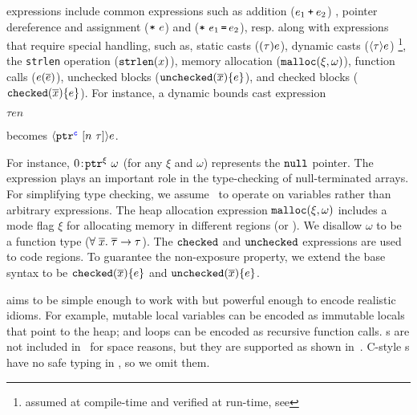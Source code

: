 \lang expressions include common expressions such as addition ($e_1 \mathbin{\texttt{+}} e_2$)
, pointer dereference and assignment ($\texttt{*}~{e}$) and ($\texttt{*}~{e_1}\,\texttt{=}\, {e_2}$), resp.
along with expressions that require special handling, such as,
 static casts ($\mathtt{(}{\tau}\mathtt{)}{e}$), dynamic casts ($\langle{\tau}\rangle{e}$) \footnote{assumed at compile-time and verified at run-time, see }, the \texttt{strlen} operation ($\mathtt{strlen}({x})$),
memory allocation ($\mathtt{malloc}({\xi},{\omega})$), 
function calls (${e}({\overline{e}})$),
unchecked blocks ($\mathtt{unchecked}({\overline{x}})\{e\}$), and checked blocks ($\mathtt{checked}({\overline{x}}){\{e\}}$).
For instance, a dynamic bounds cast expression
\begin{center}
  {\footnotesize
    $\tau$\code{>>(}$e$$n$\code{))} }
\end{center}
becomes 
{\footnotesize$\langle{\ensuremath{\mathtt{ptr}^{\textcolor{blue}{\texttt{c}}}~{[{n}~{\tau}]}}}\rangle{e}$}. 
% 

% 
For instance, ${0}\!:\!{\mathtt{ptr}^{\xi}~{\omega}}$ (for any $\xi$ and $\omega$) represents the $\mathtt{null}$ pointer.
The~ expression plays an important role in the type-checking of null-terminated arrays.
For simplifying type checking, we assume~ to operate on variables  rather than arbitrary expressions.
% 
The heap allocation expression $\mathtt{malloc}({\xi},{\omega})$ includes a mode flag $\xi$ for allocating memory in different regions (\cregion or \ucregion).
We disallow $\omega$ to be a function type ($\forall \;\overline{x}.\;{\overline{\tau}}\to\tau$).
The $\mathtt{checked}$ and $\mathtt{unchecked}$ expressions are used to
  code regions.
To guarantee the non-exposure property, we extend the base syntax to be $\mathtt{checked}({\overline{x}}){\{e\}}$ and $\mathtt{unchecked}({\overline{x}})\{e\}$.
% 

% 
\lang{} aims to be simple enough to work with but powerful enough to
encode realistic \systemname idioms. For example, mutable local
  variables can be encoded as immutable locals that point to the heap;
% 
and loops can be encoded as recursive function calls. s are
not included in~ for space reasons, but they are
supported as shown in~.
C-style s have no safe typing in \checkedc, so we omit them.


